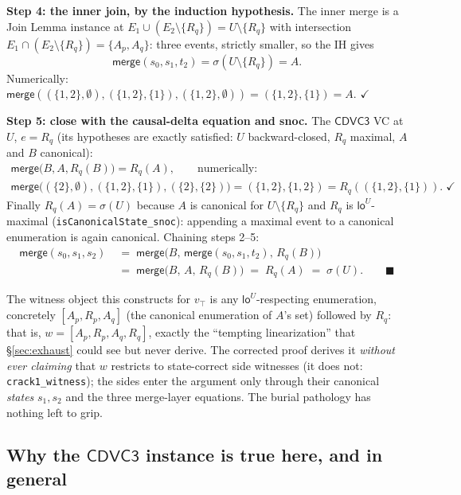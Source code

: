 \documentclass[11pt]{article}
\newcommand{\mergeL}{\mathsf{merge}}
\newcommand{\loE}[1]{\mathsf{lo}^{#1}}
\newcommand{\cd}{\mathsf{CDVC3}}
\newcommand{\lean}[1]{\texttt{#1}}
\newcommand{\Ap}{A_p}
\newcommand{\Aq}{A_q}
\newcommand{\Rp}{R_p}
\newcommand{\Rq}{R_q}
\begin{document}
\textbf{Step 4: the inner join, by the induction hypothesis.} The
inner merge is a Join Lemma instance at
$E_1 \cup (E_2 \setminus \{\Rq\}) = U \setminus \{\Rq\}$ with
intersection $E_1 \cap (E_2 \setminus \{\Rq\}) = \{\Ap,\Aq\}$: three
events, strictly smaller, so the IH gives
\[
  \mergeL(s_0, s_1, t_2) = \sigma(U \setminus \{\Rq\}) = A .
\]
Numerically: $\mergeL((\{1,2\},\emptyset), (\{1,2\},\{1\}),
(\{1,2\},\emptyset)) = (\{1,2\},\{1\}) = A$. $\checkmark$

\textbf{Step 5: close with the causal-delta equation and snoc.} The
$\cd$ VC at $U$, $e = \Rq$ (its hypotheses are exactly satisfied:
$U$ backward-closed, $\Rq$ maximal, $A$ and $B$ canonical):
\begin{gather*}
  \mergeL\bigl(B, A, \Rq(B)\bigr) = \Rq(A), \qquad
  \text{numerically:} \\
  \mergeL\bigl((\{2\},\emptyset), (\{1,2\},\{1\}),
  (\{2\},\{2\})\bigr) = (\{1,2\},\{1,2\}) = \Rq((\{1,2\},\{1\})).
  \;\checkmark
\end{gather*}
Finally $\Rq(A) = \sigma(U)$ because $A$ is canonical for
$U \setminus \{\Rq\}$ and $\Rq$ is $\loE{U}$-maximal
(\lean{isCanonicalState\_snoc}): appending a maximal event to a
canonical enumeration is again canonical. Chaining steps 2--5:
\begin{align*}
  \mergeL(s_0, s_1, s_2)
  &\;=\; \mergeL\bigl(B,\, \mergeL(s_0,s_1,t_2),\, \Rq(B)\bigr) \\
  &\;=\; \mergeL\bigl(B,\, A,\, \Rq(B)\bigr)
  \;=\; \Rq(A)
  \;=\; \sigma(U). \qquad \blacksquare
\end{align*}

The witness object this constructs for $v_\top$ is any
$\loE{U}$-respecting enumeration, concretely $[\Ap,\Rp,\Aq]$ (the
canonical enumeration of $A$'s set) followed by $\Rq$: that is,
$w = [\Ap, \Rp, \Aq, \Rq]$, exactly the ``tempting linearization''
that \S\ref{sec:exhaust} could see but never derive. The corrected
proof derives it \emph{without ever claiming} that $w$ restricts to
state-correct side witnesses (it does not: \lean{crack1\_witness});
the sides enter the argument only through their canonical
\emph{states} $s_1, s_2$ and the three merge-layer equations. The
burial pathology has nothing left to grip.

\subsection{Why the $\cd$ instance is true here, and in general}
\end{document}
